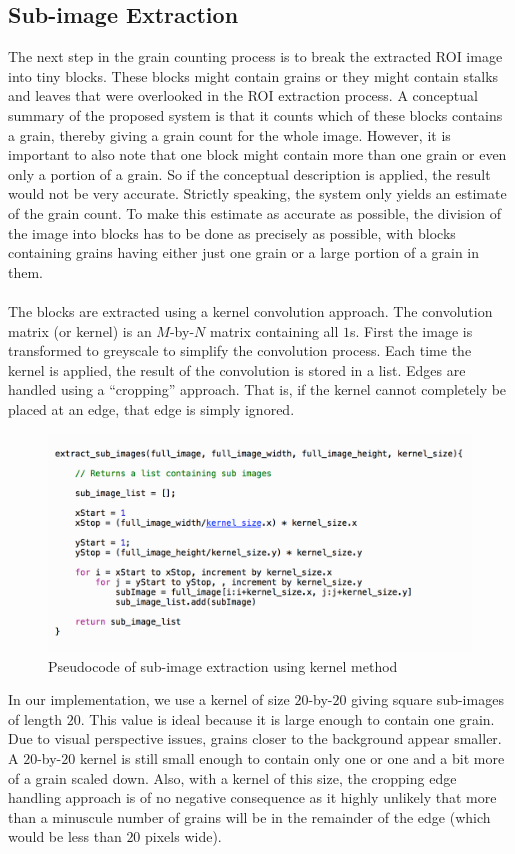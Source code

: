 \subsection{Sub-image Extraction}
The next step in the grain counting process is to break the extracted ROI image into tiny blocks. These blocks might contain grains or they might contain stalks and leaves that were overlooked in the ROI extraction process. A conceptual summary of the proposed system is that it counts which of these blocks contains a grain, thereby giving a grain count for the whole image. However, it is important to also note that one block might contain more than one grain or even only a portion of a grain. So if the conceptual description is applied, the result would not be very accurate. Strictly speaking, the system only yields an estimate of the grain count. To make this estimate as accurate as possible, the division of the image into blocks has to be done as precisely as possible, with blocks containing grains having either just one grain or a large portion of a grain in them.\\ \\
%
The blocks are extracted using a kernel convolution approach. The convolution matrix (or kernel) is an $M$-by-$N$ matrix containing all $1$s. First the image is transformed to greyscale to simplify the convolution process. Each time the kernel is applied, the result of the convolution is stored in a list. Edges are handled using a ``cropping'' approach. That is, if the kernel cannot completely be placed at an edge, that edge is simply ignored.
\begin{figure}[ht!]
\centering
\includegraphics[scale=0.6]{kernel}
\caption{Pseudocode of sub-image extraction using kernel method}
\label{fig1}
\end{figure}
In our implementation, we use a kernel of size $20$-by-$20$ giving square sub-images of length $20$. This value is ideal because it is large enough to contain one grain. Due to visual perspective issues, grains closer to the background appear smaller. A $20$-by-$20$ kernel is still small enough to contain only one or one and a bit more of a grain scaled down. Also, with a kernel of this size, the cropping edge handling approach is of no negative consequence as it highly unlikely that more than a minuscule number of grains will be in the remainder of the edge (which would be less than $20$ pixels wide).

